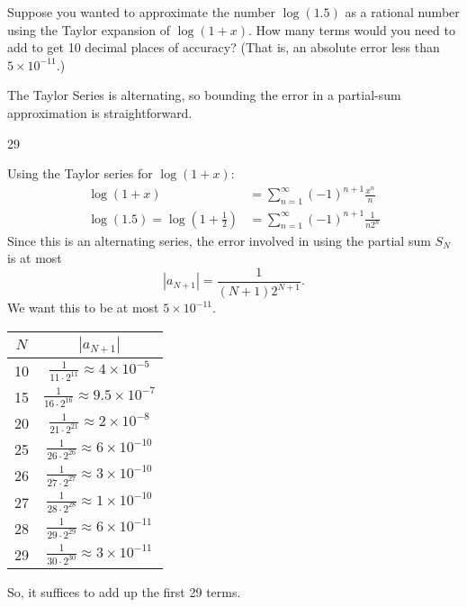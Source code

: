 \begin{question}
Suppose you wanted to approximate the number $\log(1.5)$ as a rational number using the Taylor expansion of $\log(1+x)$. How many terms would you need to add to get 10 decimal places of accuracy? (That is, an absolute error less than $5\times10^{-11}$.)

\end{question}
\begin{hint}
The Taylor Series is alternating, so  bounding the error in a partial-sum approximation is straightforward.
\end{hint}
\begin{answer}
	29
\end{answer}
\begin{solution}
	Using the Taylor series for $\log(1+x)$:
	\begin{align*}
	\log(1+x)&=\sum_{n=1}^\infty (-1)^{n+1}\frac{x^n}{n}\\
	\log(1.5)=\log\left(1+\frac12\right)&=\sum_{n=1}^\infty (-1)^{n+1}\frac{1}{n2^n}
	\end{align*}
Since this is an alternating series, the error involved in using the partial sum $S_N$ is at most
\[|a_{N+1}|=\frac{1}{(N+1)2^{N+1}}.\]
We want this to be at most $5 \times 10^{-11}$.
\begin{center}
	\begin{tabular}{|c|c|}
		\hline
		$N$&$|a_{N+1}|$\\ \hline
		10 & $\displaystyle \frac{1}{11\cdot 2^{11}}\approx 4\times 10^{-5}$\\
		\hline
		15 & $\displaystyle\frac{1}{16\cdot 2^{16}}\approx 9.5\times 10^{-7}$\\
		\hline
		20 & $\displaystyle\frac{1}{21\cdot 2^{21}}\approx 2 \times 10^{-8}$\\
		\hline
		25 & $\displaystyle\frac{1}{26\cdot 2^{26}}\approx 6 \times 10^{-10}$\\
		\hline
		26 & $\displaystyle\frac{1}{27\cdot 2^{27}}\approx 3 \times 10^{-10}$\\
		\hline
		27 & $\displaystyle\frac{1}{28\cdot 2^{28}}\approx 1 \times 10^{-10}$\\
		\hline
		28 & $\displaystyle\frac{1}{29\cdot 2^{29}}\approx 6 \times 10^{-11}$\\
		\hline
		29 & $\displaystyle\frac{1}{30\cdot 2^{30}}\approx 3 \times 10^{-11}$\\
		\hline
	\end{tabular}
\end{center}
So, it suffices to add up the first 29 terms.
\end{solution}


